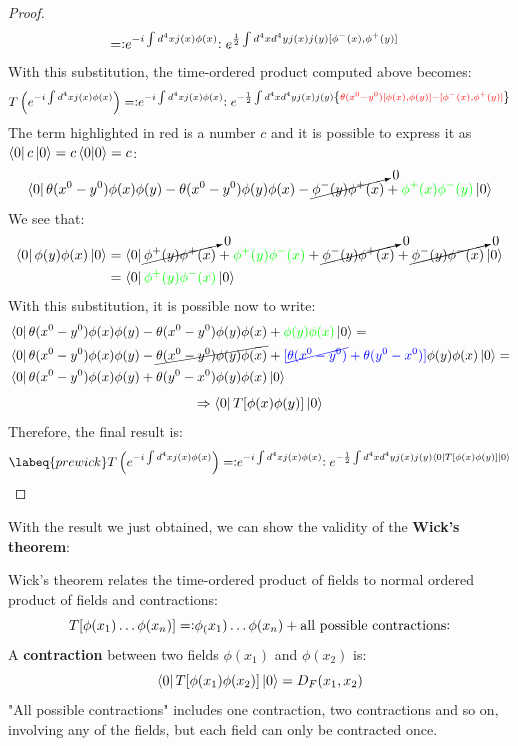 \documentclass[../main.tex]{subfiles}
\begin{document}
\begin{proof}
\begin{align*}
&=\vcentcolon\mathrel{e^{-i\int d^4xj(x)\phi(x)}}\vcentcolon e^{\frac{1}{2}\int d^4xd^4yj(x)j(y)[\phi^-(x),\phi^+(y)]}
\end{align*}
With this substitution, the time-ordered product computed above becomes:
\[
T\left(e^{-i\int d^4xj(x)\phi(x)}\right)=\vcentcolon\mathrel{e^{-i\int d^4xj(x)\phi(x)}}\vcentcolon e^{-\frac{1}{2}\int d^4xd^4yj(x)j(y)\left\{{\color{red}\theta(x^0-y^0)[\phi(x),\phi(y)]-[\phi^-(x),\phi^+(y)]}\right\}}
\]
The term highlighted in red is a number $c$ and it is possible to express it as $\bra{0}c\ket{0}=c\bra{0}\ket{0}=c$:
\[
\bra{0}\theta(x^0-y^0)\phi(x)\phi(y)-\theta(x^0-y^0)\phi(y)\phi(x)-\cancelto{0}{\phi^-(y)\phi^+(x)}+{\color{green}\phi^+(x)\phi^-(y)}\ket{0}
\]
We see that:
\begin{align*}
\bra{0}\phi(y)\phi(x)\ket{0}&=\bra{0}\cancelto{0}{\phi^+(y)\phi^+(x)}+{\color{green}\phi^+(y)\phi^-(x)}+\cancelto{0}{\phi^-(y)\phi^+(x)}+\cancelto{0}{\phi^-(y)\phi^-(x)}\ket{0}\\
&=\bra{0}{{\color{green}\phi^+(y)\phi^-(x)}}\ket{0}
\end{align*}
With this substitution, it is possible now to write:
\begin{align*}
&\bra{0}\theta(x^0-y^0)\phi(x)\phi(y)-\theta(x^0-y^0)\phi(y)\phi(x)+{\color{green}\phi(y)\phi(x)}\ket{0}=\\
&\bra{0}\theta(x^0-y^0)\phi(x)\phi(y)-\cancel{\theta(x^0-y^0)\phi(y)\phi(x)}+{\color{blue}[\cancel{\theta(x^0-y^0)}+\theta(y^0-x^0)]}\phi(y)\phi(x)\ket{0}=\\
&\bra{0}\theta(x^0-y^0)\phi(x)\phi(y)+\theta(y^0-x^0)\phi(y)\phi(x)\ket{0}
\end{align*}
\[
\Rightarrow\bra{0}T[\phi(x)\phi(y)]\ket{0}
\]
Therefore, the final result is:
\begin{equation}
\labeq{prewick}
T\left(e^{-i\int d^4xj(x)\phi(x)}\right)=\norder{e^{-i\int d^4xj(x)\phi(x)}}e^{-\frac{1}{2}\int d^4xd^4yj(x)j(y)\bra{0}T[\phi(x)\phi(y)]\ket{0}}
\end{equation}
\end{proof}
With the result we just obtained, we can show the validity of the \textbf{Wick's theorem}:
\begin{theorem}
Wick's theorem relates the time-ordered product of fields to normal ordered product of fields and contractions:
\[
T[\phi(x_1)\dots\phi(x_n)]=\vcentcolon\mathrel{\phi_(x_1)\dots\phi(x_n)+\text{all possible contractions}}\vcentcolon
\]
A \textbf{contraction} between two fields $\phi(x_1)$ and $\phi(x_2)$ is:
\[
\bra{0}T[\phi(x_1)\phi(x_2)]\ket{0}=D_F(x_1,x_2)
\]
"All possible contractions" includes one contraction, two contractions and so on, involving any of the fields, but each field can only be contracted once. 
\end{theorem}
\end{document}
